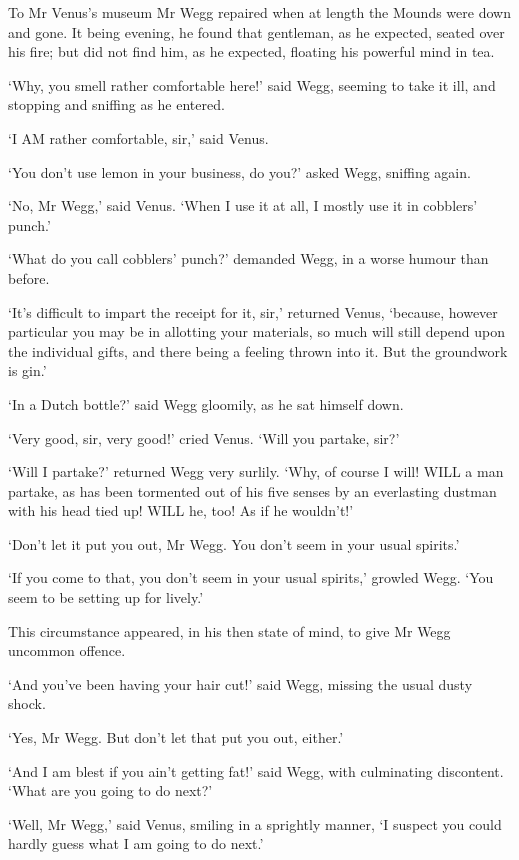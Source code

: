 To Mr Venus’s museum Mr Wegg repaired when at length the Mounds
were down and gone. It being evening, he found that gentleman, as he
expected, seated over his fire; but did not find him, as he expected,
floating his powerful mind in tea.

‘Why, you smell rather comfortable here!’ said Wegg, seeming to take it
ill, and stopping and sniffing as he entered.

‘I AM rather comfortable, sir,’ said Venus.

‘You don’t use lemon in your business, do you?’ asked Wegg, sniffing
again.

‘No, Mr Wegg,’ said Venus. ‘When I use it at all, I mostly use it in
cobblers’ punch.’

‘What do you call cobblers’ punch?’ demanded Wegg, in a worse humour
than before.

‘It’s difficult to impart the receipt for it, sir,’ returned Venus,
‘because, however particular you may be in allotting your materials,
so much will still depend upon the individual gifts, and there being a
feeling thrown into it. But the groundwork is gin.’

‘In a Dutch bottle?’ said Wegg gloomily, as he sat himself down.

‘Very good, sir, very good!’ cried Venus. ‘Will you partake, sir?’

‘Will I partake?’ returned Wegg very surlily. ‘Why, of course I will!
WILL a man partake, as has been tormented out of his five senses by
an everlasting dustman with his head tied up! WILL he, too! As if he
wouldn’t!’

‘Don’t let it put you out, Mr Wegg. You don’t seem in your usual
spirits.’

‘If you come to that, you don’t seem in your usual spirits,’ growled
Wegg. ‘You seem to be setting up for lively.’

This circumstance appeared, in his then state of mind, to give Mr Wegg
uncommon offence.

‘And you’ve been having your hair cut!’ said Wegg, missing the usual
dusty shock.

‘Yes, Mr Wegg. But don’t let that put you out, either.’

‘And I am blest if you ain’t getting fat!’ said Wegg, with culminating
discontent. ‘What are you going to do next?’

‘Well, Mr Wegg,’ said Venus, smiling in a sprightly manner, ‘I suspect
you could hardly guess what I am going to do next.’

